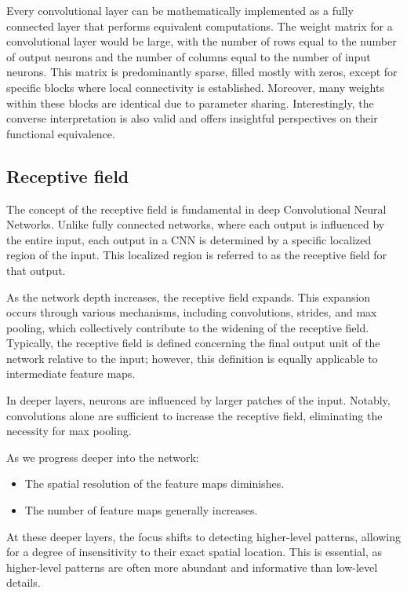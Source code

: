Every convolutional layer can be mathematically implemented as a fully connected layer that performs equivalent computations.
The weight matrix for a convolutional layer would be large, with the number of rows equal to the number of output neurons and the number of columns equal to the number of input neurons. 
This matrix is predominantly sparse, filled mostly with zeros, except for specific blocks where local connectivity is established. 
Moreover, many weights within these blocks are identical due to parameter sharing.
Interestingly, the converse interpretation is also valid and offers insightful perspectives on their functional equivalence.

\subsection{Receptive field}
The concept of the receptive field is fundamental in deep Convolutional Neural Networks. 
Unlike fully connected networks, where each output is influenced by the entire input, each output in a CNN is determined by a specific localized region of the input. 
This localized region is referred to as the receptive field for that output.

As the network depth increases, the receptive field expands. 
This expansion occurs through various mechanisms, including convolutions, strides, and max pooling, which collectively contribute to the widening of the receptive field. 
Typically, the receptive field is defined concerning the final output unit of the network relative to the input; however, this definition is equally applicable to intermediate feature maps.

In deeper layers, neurons are influenced by larger patches of the input. 
Notably, convolutions alone are sufficient to increase the receptive field, eliminating the necessity for max pooling.

As we progress deeper into the network:
\begin{itemize}
    \item The spatial resolution of the feature maps diminishes.
    \item The number of feature maps generally increases.
\end{itemize}
At these deeper layers, the focus shifts to detecting higher-level patterns, allowing for a degree of insensitivity to their exact spatial location. 
This is essential, as higher-level patterns are often more abundant and informative than low-level details.